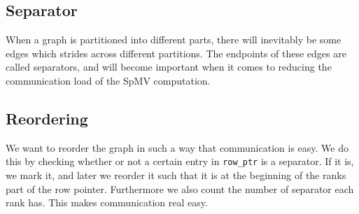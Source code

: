 

\subsection{Separator}
When a graph is partitioned into different parts, there will inevitably be some edges which strides across different partitions. The endpoints of these edges are called separators, and will become important when it comes to reducing the communication load of the SpMV computation.

\subsection{Reordering}
We want to reorder the graph in such a way that communication is easy. We do this by checking whether or not a certain entry in \texttt{row\_ptr} is a separator. If it is, we mark it, and later we reorder it such that it is at the beginning of the ranks part of the row pointer. Furthermore we also count the number of separator each rank has. This makes communication real easy.

